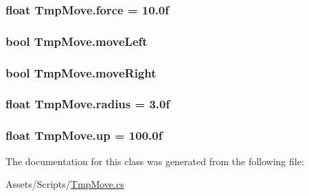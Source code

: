 \subsubsection[{force}]{\setlength{\rightskip}{0pt plus 5cm}float Tmp\+Move.\+force = 10.\+0f}\label{class_tmp_move_a9794fc2a6dbb724a2f2fd136d31b4b56}
\hypertarget{class_tmp_move_ace01696c72f650fc1236a8fa61f25bdb}{}
\subsubsection[{move\+Left}]{\setlength{\rightskip}{0pt plus 5cm}bool Tmp\+Move.\+move\+Left}\label{class_tmp_move_ace01696c72f650fc1236a8fa61f25bdb}
\hypertarget{class_tmp_move_a6130ea3b4538fa1761dfc4aeb5cc4ac3}{}
\subsubsection[{move\+Right}]{\setlength{\rightskip}{0pt plus 5cm}bool Tmp\+Move.\+move\+Right}\label{class_tmp_move_a6130ea3b4538fa1761dfc4aeb5cc4ac3}
\hypertarget{class_tmp_move_a2537f998679f53ecc891a26d134e88d2}{}
\subsubsection[{radius}]{\setlength{\rightskip}{0pt plus 5cm}float Tmp\+Move.\+radius = 3.\+0f}\label{class_tmp_move_a2537f998679f53ecc891a26d134e88d2}
\hypertarget{class_tmp_move_acd3157eed57aa98545625c0e743d7744}{}
\subsubsection[{up}]{\setlength{\rightskip}{0pt plus 5cm}float Tmp\+Move.\+up = 100.\+0f}\label{class_tmp_move_acd3157eed57aa98545625c0e743d7744}


The documentation for this class was generated from the following file\+:\begin{DoxyCompactItemize}
\item 
Assets/\+Scripts/\hyperlink{_tmp_move_8cs}{Tmp\+Move.\+cs}\end{DoxyCompactItemize}
